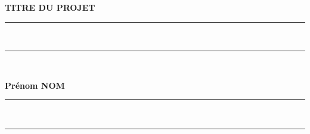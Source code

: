\newpage
\thispagestyle{empty}
\begin{center}
  \renewcommand*{\familydefault}{\defaultFont}
  \fontsize{12pt}{12pt}\selectfont%
  \textbf{
  TITRE DU PROJET\\%
  }
\vspace{15pt} {%
  \begin{spacing}{0.05}
    \rule{200pt}{2pt}\\
    \rule{200pt}{0.75pt}\\
  \end{spacing}
  \renewcommand*{\familydefault}{\defaultFont}
  \fontsize{14pt}{14pt}\selectfont%
  \vspace{15pt}
  \textbf{Prénom NOM}
  \vspace{8pt}
  \begin{spacing}{0.05}
    \rule{200pt}{0.75pt}\\
    \rule{200pt}{2pt}\\
  \end{spacing}
}
\end{center}

